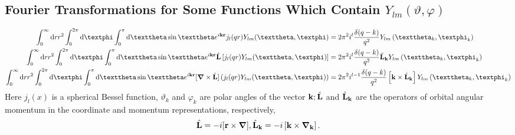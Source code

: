\subsection{Fourier Transformations for Some Functions Which Contain $Y_{l m}(\vartheta, \varphi)$}\label{sec:5.9.2}
\begin{align}
\int_{0}^{\infty} \dd r r^{2} \int_{0}^{2 \pi} \dd \varphi \int_{0}^{\pi} \dd \vartheta \sin \vartheta e^{i \vect{k} \vect{r}} j_{l}(q r) Y_{l m}(\vartheta, \varphi)&=2 \pi^{2} i^{l} \frac{\delta(q-k)}{q^{2}} Y_{l m}\left(\vartheta_{k}, \varphi_{k}\right)  \label{eq:5:9:6}\\
\int_{0}^{\infty} \dd r r^{2} \int_{0}^{2 \pi} \dd \varphi \int_{0}^{\pi} \dd \vartheta \sin \vartheta e^{i \vect{k} \vect{r}} \hat{\vect{L}}\left [j_{l}(q r) Y_{l m}(\vartheta, \varphi)\right]&=2 \pi^{2} i^{l} \frac{\delta(q-k)}{q^{2}} \hat{\vect{L}}_{\vect{k}} Y_{l m}\left(\vartheta_{k}, \varphi_{k}\right)  \label{eq:5:9:7}\\
\int_{0}^{\infty} \dd r r^{2} \int_{0}^{2 \pi} \dd \varphi \int_{0}^{\pi} \dd \vartheta \sin \vartheta e^{i \vect{k} \vect{r}}[\boldsymbol{\nabla} \times \hat{\vect{L}}]\left(j_{l}(q r) Y_{l m}(\vartheta, \varphi)\right)&=2 \pi^{2} i^{l-1} \frac{\delta(q-k)}{q^{2}}\left[\vect{k} \times \hat{\vect{L}}_{\vect{k}}\right] Y_{l m}\left(\vartheta_{k}, \varphi_{k}\right) \label{eq:5:9:8}
\end{align}
Here $j_{l}(x)$ is a spherical Bessel function, $\vartheta_{k}$ and $\varphi_{k}$ are polar angles of the vector $\mathbf{k} ; \hat{\mathbf{L}}$ and $\hat{\mathbf{L}}_{\mathbf{k}}$ are the operators of orbital angular momentum in the coordinate and momentum representations, respectively,
\begin{equation}
\hat{\mathbf{L}}=-i[\mathbf{r} \times \boldsymbol{\nabla}], \hat{\mathbf{L}}_{\mathbf{k}}=-i\left[\mathbf{k} \times \boldsymbol{\nabla}_{\mathbf{k}}\right] . \label{eq:5:9:9}
\end{equation}
